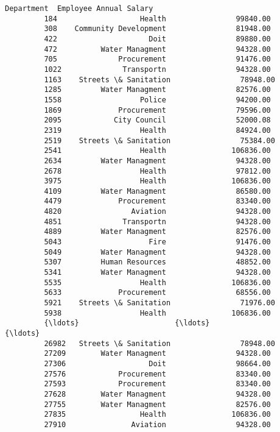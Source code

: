\documentclass[11pt]{article}
\begin{document}
\begin{Verbatim}[commandchars=\\\{\}]
                           Department  Employee Annual Salary  
         184                   Health                99840.00  
         308    Community Development                81948.00  
         422                     Doit                89880.00  
         472          Water Managment                94328.00  
         705              Procurement                91476.00  
         1022              Transportn                94328.00  
         1163    Streets \& Sanitation                78948.00  
         1285         Water Managment                82576.00  
         1558                  Police                94200.00  
         1869             Procurement                79596.00  
         2095            City Council                52000.08  
         2319                  Health                84924.00  
         2519    Streets \& Sanitation                75384.00  
         2541                  Health               106836.00  
         2634         Water Managment                94328.00  
         2678                  Health                97812.00  
         3975                  Health               106836.00  
         4109         Water Managment                86580.00  
         4479             Procurement                83340.00  
         4820                Aviation                94328.00  
         4851              Transportn                94328.00  
         4889         Water Managment                82576.00  
         5043                    Fire                91476.00  
         5049         Water Managment                94328.00  
         5307         Human Resources                48852.00  
         5341         Water Managment                94328.00  
         5535                  Health               106836.00  
         5633             Procurement                68556.00  
         5921    Streets \& Sanitation                71976.00  
         5938                  Health               106836.00  
         {\ldots}                      {\ldots}                     {\ldots}  
         26982   Streets \& Sanitation                78948.00  
         27209        Water Managment                94328.00  
         27306                   Doit                98664.00  
         27576            Procurement                83340.00  
         27593            Procurement                83340.00  
         27628        Water Managment                94328.00  
         27755        Water Managment                82576.00  
         27835                 Health               106836.00  
         27910               Aviation                94328.00  

\end{Verbatim}
\end{document}
